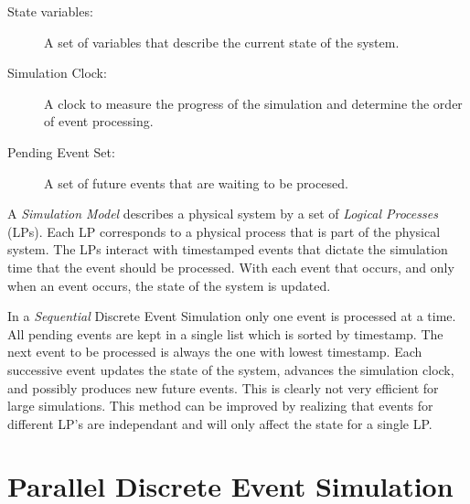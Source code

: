 \documentclass[11pt]{book}
\begin{document}
\begin{description}
    \item[State variables: ] A set of variables that describe the current state of the system.
    \item[Simulation Clock: ] A clock to measure the progress of the simulation and determine
        the order of event processing.
    \item[Pending Event Set: ] A set of future events that are waiting to be procesed.
\end{description}

\noindent
A \emph{Simulation Model} describes a physical system by a set of \emph{Logical Processes}
(LPs). Each LP corresponds to a physical process that is part of the physical system. The
LPs interact with timestamped events that dictate the simulation time that the event should
be processed. With each event that occurs, and only when an event occurs, the state of the
system is updated.

In a \emph{Sequential} Discrete Event Simulation only one event is processed at a time.
All pending events are kept in a single list which is sorted by timestamp. The next event
to be processed is always the one with lowest timestamp. Each successive event updates the
state of the system, advances the simulation clock, and possibly produces new future events.
This is clearly not very efficient for large simulations. This method can be improved by
realizing that events for different LP's are independant and will only affect the state for
a single LP.

\section{Parallel Discrete Event Simulation}
\end{document}
